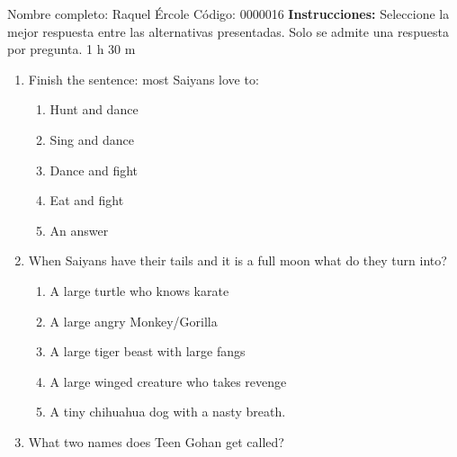 \documentclass[letterpaper,addpoints,answers,twocolumn,10pt]{exam}
\begin{document}
\noindent Nombre completo: Raquel Ércole
\newline \newline \newline \newline
Código: 0000016\newline \newline 
{\bf Instrucciones:} Seleccione la mejor respuesta entre las alternativas presentadas. Solo se admite una respuesta por pregunta.
 1 h 30 m

\begin{enumerate}[leftmargin=.2in]




\item  Finish the sentence: most Saiyans love to:


\begin{enumerate}[noitemsep,leftmargin=0in]


\item  Hunt and dance
\item  Sing and dance
\item  Dance and fight
\item  Eat and fight
\item  An answer


\end{enumerate}



\item  When Saiyans have their tails and it is a full moon what do they turn into?


\begin{enumerate}[noitemsep,leftmargin=0in]


\item  A large turtle who knows karate
\item  A large angry Monkey/Gorilla
\item  A large tiger beast with large fangs
\item  A large winged creature who takes revenge
\item  A tiny chihuahua dog with a nasty breath.


\end{enumerate}



\item  What two names does Teen Gohan get called?


\begin{enumerate}[noitemsep,leftmargin=0in]



\end{enumerate}
\end{enumerate}
\end{document}
